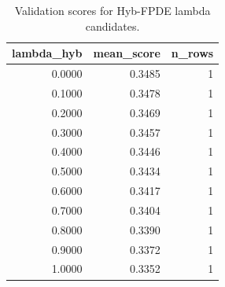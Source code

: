 \begin{table}[t]
\caption{Validation scores for Hyb-FPDE lambda candidates.}
\label{tab:lambda_distribution_computed}
\centering
\begin{tabular}{rrr}
\toprule
lambda\_hyb & mean\_score & n\_rows \\
\midrule
0.0000 & 0.3485 & 1 \\
0.1000 & 0.3478 & 1 \\
0.2000 & 0.3469 & 1 \\
0.3000 & 0.3457 & 1 \\
0.4000 & 0.3446 & 1 \\
0.5000 & 0.3434 & 1 \\
0.6000 & 0.3417 & 1 \\
0.7000 & 0.3404 & 1 \\
0.8000 & 0.3390 & 1 \\
0.9000 & 0.3372 & 1 \\
1.0000 & 0.3352 & 1 \\
\bottomrule
\end{tabular}

\end{table}
